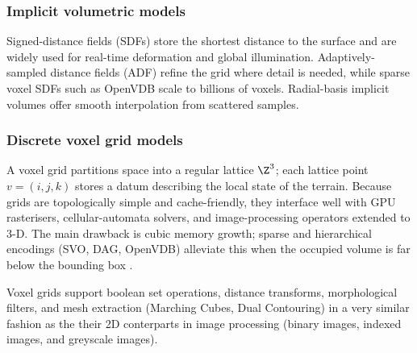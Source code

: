 \subsubsection{Implicit volumetric models}
    
Signed-distance fields (SDFs) store the shortest distance to the surface and are widely used for real-time deformation and global illumination. Adaptively-sampled distance fields (ADF) \cite{Frisken2000} refine the grid where detail is needed, while sparse voxel SDFs such as OpenVDB scale to billions of voxels. Radial-basis implicit volumes offer smooth interpolation from scattered samples.

\subsubsection{Discrete voxel grid models}
A voxel grid partitions space into a regular lattice $\Z^{3}$; each lattice point $v=(i,j,k)$ stores a datum describing the local state of the terrain. Because grids are topologically simple and cache-friendly, they interface well with GPU rasterisers, cellular-automata solvers, and image-processing operators extended to 3-D. The main drawback is cubic memory growth; sparse and hierarchical encodings (SVO, DAG, OpenVDB) alleviate this when the occupied volume is far below the bounding box
\cite{Laine2010,Villanueva2017,Museth2013}.

Voxel grids support boolean set operations, distance transforms, morphological filters, and mesh extraction (Marching Cubes, Dual Contouring) in a very similar fashion as the their 2D conterparts in image processing (binary images, indexed images, and greyscale images).

